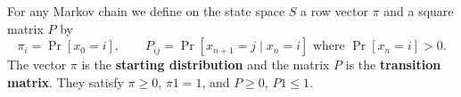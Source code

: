 For any Markov chain we define on the state space $S$ a row vector $\pi$ and a square matrix $P$ by
$$\pi_i = \Pr[x_0 = i], \qquad P_{ij} = \Pr[x_{n+1} = j \mid x_n = i] \text{ where } \Pr[x_n = i] > 0.$$
The vector $\pi$ is the \textbf{starting distribution} and the matrix $P$ is the \textbf{transition matrix}. They satisfy $\pi \geq 0$, $\pi 1 = 1$, and $P \geq 0$, $P1 \leq 1$.